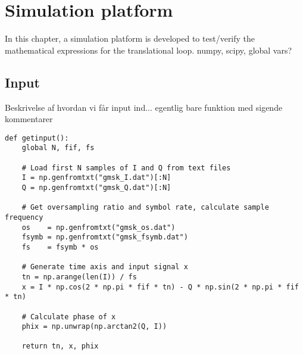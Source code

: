 

\chapter{Simulation platform} \label{ch:intro}
In this chapter, a simulation platform is developed to test/verify the mathematical expressions for the translational loop. numpy, scipy, global vars?

\section{Input}
Beskrivelse af hvordan vi får input ind... egentlig bare funktion med sigende kommentarer

\lstset{language=python,caption=Reading the input data files,label=code:getinput}
\begin{lstlisting}
def getinput():
    global N, fif, fs

    # Load first N samples of I and Q from text files
    I = np.genfromtxt("gmsk_I.dat")[:N]
    Q = np.genfromtxt("gmsk_Q.dat")[:N]

    # Get oversampling ratio and symbol rate, calculate sample frequency
    os    = np.genfromtxt("gmsk_os.dat")
    fsymb = np.genfromtxt("gmsk_fsymb.dat")
    fs    = fsymb * os

    # Generate time axis and input signal x
    tn = np.arange(len(I)) / fs
    x = I * np.cos(2 * np.pi * fif * tn) - Q * np.sin(2 * np.pi * fif * tn)

    # Calculate phase of x
    phix = np.unwrap(np.arctan2(Q, I))

    return tn, x, phix
\end{lstlisting}



